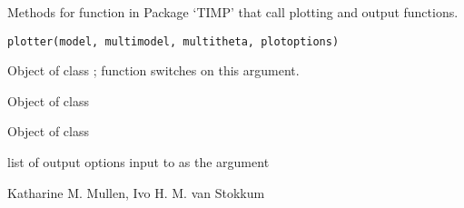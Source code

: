 \documentclass{article}
\begin{document}
\begin{Description}\relax
Methods for function  in Package `TIMP' that 
call plotting and output functions.
\end{Description}
\begin{Usage}
\begin{verbatim}
plotter(model, multimodel, multitheta, plotoptions)
\end{verbatim}
\end{Usage}
\begin{Arguments}
\begin{ldescription}
\item[\code{model}] Object of class ; function switches on this 
argument. 
\item[\code{multimodel}] Object of class 
\item[\code{multitheta}] Object of class 
\item[\code{plotoptions}] list of output options 
input to  as the argument 
\end{ldescription}
\end{Arguments}
\begin{Author}\relax
Katharine M. Mullen, Ivo H. M. van Stokkum
\end{Author}
\begin{SeeAlso}\relax
{}
\end{SeeAlso}
\end{document}

